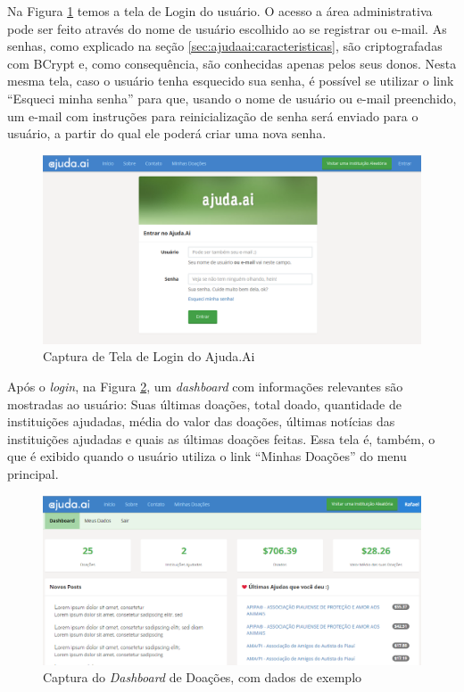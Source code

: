 Na Figura \ref{fig:ss_ajudaai_07} temos a tela de Login do usuário. O acesso a área administrativa pode ser feito através do nome de usuário escolhido ao se registrar ou e-mail. As senhas, como explicado na seção \ref{sec:ajudaai:caracteristicas}, são criptografadas com BCrypt e, como consequência, são conhecidas apenas pelos seus donos. Nesta mesma tela, caso o usuário tenha esquecido sua senha, é possível se utilizar o link ``Esqueci minha senha'' para que, usando o nome de usuário ou e-mail preenchido, um e-mail com instruções para reinicialização de senha será enviado para o usuário, a partir do qual ele poderá criar uma nova senha.

\begin{figure}[H]
	\caption{\label{fig:ss_ajudaai_07}Captura de Tela de Login do Ajuda.Ai}
    \centering
    \includegraphics[scale=0.48]{imagens/screenshot-ajudaai-07.png}
\end{figure}

Após o \emph{login}, na Figura \ref{fig:ss_ajudaai_08}, um \emph{dashboard} com informações relevantes são mostradas ao usuário: Suas últimas doações, total doado, quantidade de instituições ajudadas, média do valor das doações, últimas notícias das instituições ajudadas e quais as últimas doações feitas. Essa tela é, também, o que é exibido quando o usuário utiliza o link ``Minhas Doações'' do menu principal.

\begin{figure}[H]
	\caption{\label{fig:ss_ajudaai_08}Captura do \emph{Dashboard} de Doações, com dados de exemplo}
    \centering
    \includegraphics[scale=0.5]{imagens/screenshot-ajudaai-08.png}
\end{figure}










